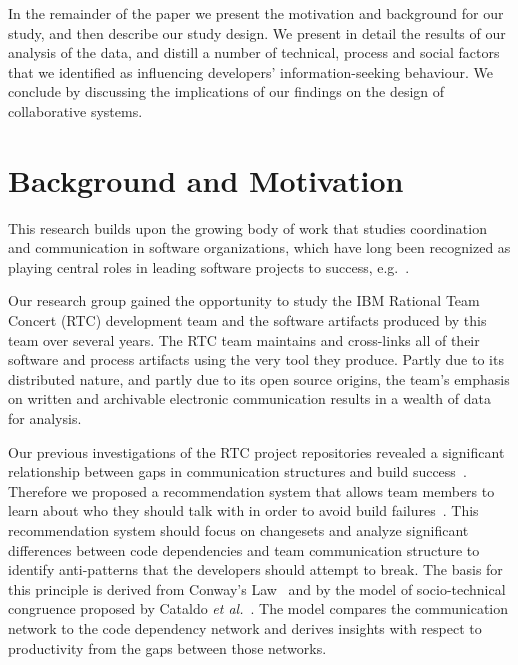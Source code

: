 \documentclass[12pt,oneside]{book}
\begin{document}
In the remainder of the paper we present the motivation and background for our study, and then describe our study design.  We present in detail the results of our analysis of the data, and distill a number of technical, process and social factors that we identified as influencing developers' information-seeking behaviour. We conclude by discussing the implications of our findings on the design of collaborative systems. 

\section{Background and Motivation}
\label{sec:rq}

This research builds upon the growing body of work that studies coordination and communication in software organizations, which have long been recognized as playing central roles in leading software projects to success, e.g.~\cite{kraut:1995coordination,curtis:acm:1988}.  
\vspace{-2pt}

Our research group gained the opportunity to study the IBM Rational Team Concert (RTC) development team and the software artifacts produced by this team over several years. The RTC team maintains and cross-links all of their software and process artifacts using the very tool they produce. Partly due to its distributed nature, and partly due to its open source origins, the team's emphasis on written and archivable electronic communication results in a wealth of data for analysis.
\vspace{-2pt}

Our previous investigations of the RTC project repositories revealed a significant relationship between gaps in communication structures and build success~\cite{wolf:icse:2009}. Therefore we proposed a recommendation system that allows team members to learn about who they should talk with in order to avoid build failures~\cite{schroeter:rsse:2008}. This recommendation system should focus on changesets and analyze significant differences between code dependencies and team communication structure to identify anti-patterns that the developers should attempt to break.
The basis for this principle is derived from Conway's Law~\cite{conway:datamination:1968} and by the model of socio-technical congruence proposed by Cataldo \emph{et al.}~\cite{cataldo:cscw:2006,cataldo:esem:2008}.
The model compares the communication network to the code dependency network and derives insights with respect to productivity from the gaps between those networks.
\vspace{-2pt}
\end{document}
